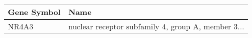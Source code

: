 \begin{tabular}{ll}
\toprule
Gene Symbol &                                               Name \\
\midrule
      NR4A3 & nuclear receptor subfamily 4, group A, member 3... \\
\bottomrule
\end{tabular}
